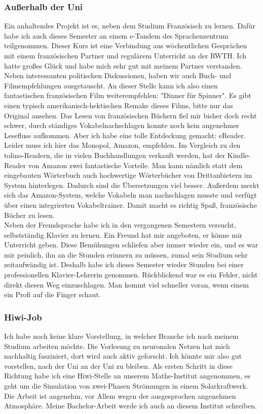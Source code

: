 \documentclass[12pt]{article}
\begin{document}
\begin{large}
\subsubsection{Außerhalb der Uni}
Ein anhaltendes Projekt ist es, neben dem Studium Französisch zu lernen. Dafür habe ich auch dieses Semester an einem e-Tandem des Sprachenzentrum teilgenommen.
Dieser Kurs ist eine Verbindung aus wöchentlichen Gesprächen mit einem französischen Partner und regulärem Unterricht an der RWTH.
Ich hatte großes Glück und habe mich sehr gut mit meinem Partner verstanden.
Neben interessanten politischen Diskussionen, haben wir auch Buch- und Filmempfehlungen ausgetauscht. An dieser Stelle kann ich also einen fantastischen französischen Film weiterempfehlen: "Dinner für Spinner". Es gibt einen typisch amerikanisch-hektischen Remake dieses Films, bitte nur das Original ansehen. Das Lesen von französischen Büchern fiel mir bisher doch recht schwer, durch ständiges Vokabelnachschlagen konnte noch kein angenehmer Lesefluss aufkommen. Aber ich habe eine tolle Entdeckung gemacht: eReader. Leider muss ich hier das Monopol, Amazon, empfehlen. Im Vergleich zu den tolino-Readern, die in vielen Buchhandlungen verkauft werden, hat der Kindle-Reader von Amazon zwei fantastische Vorteile. Man kann nämlich statt dem eingebauten Wörterbuch auch hochwertige Wörterbücher von Drittanbietern im System hinterlegen. Dadurch sind die Übersetzungen viel besser. Außerdem merkt sich das Amazon-System, welche Vokabeln man nachschlagen musste und verfügt über einen integrierten Vokabeltrainer. Damit macht es richtig Spaß, französische Bücher zu lesen. \\
Neben der Fremdsprache habe ich in den vergangenen Semestern versucht, selbstständig Klavier zu lernen. Ein Freund hat mir angeboten, er könne mir Unterricht geben. Diese Bemühungen schliefen aber immer wieder ein, und es war mir peinlich, ihn an die Stunden erinnern zu müssen, zumal sein Studium sehr zeitaufwändig ist. Deshalb habe ich dieses Semester wieder Stunden bei einer professionellen Klavier-Lehrerin genommen. Rückblickend war es ein Fehler, nicht direkt diesen Weg einzuschlagen. Man kommt viel schneller voran, wenn einem ein Profi auf die Finger schaut.

\subsubsection{Hiwi-Job}
Ich habe noch keine klare Vorstellung, in welcher Branche ich nach meinem Studium arbeiten möchte. Die Vorlesung zu neuronalen Netzen hat mich nachhaltig fasziniert, dort wird auch aktiv geforscht. Ich könnte mir also gut vorstellen, nach der Uni an der Uni zu bleiben. Als ersten Schritt in diese Richtung habe ich eine Hiwi-Stelle an unserem Mathe-Institut angenommen, es geht um die Simulation von zwei-Phasen Strömungen in einem Solarkraftwerk. Die Arbeit ist angenehm, vor Allem wegen der ausgesprochen angenehmen Atmosphäre. Meine Bachelor-Arbeit werde ich auch an diesem Institut schreiben.


\end{large}
\end{document}

